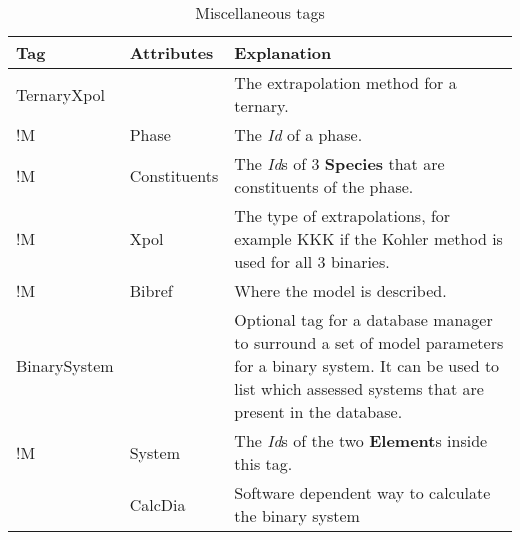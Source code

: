 \documentclass[10pt]{article}
\begin{document}

\begin{table}[!h]
  \caption{Miscellaneous tags}
\begin{tabular}{|p{} p{} p{}|}\hline
  Tag & Attributes & Explanation\\\hline

  TernaryXpol & & The extrapolation method for a ternary.\\
!M      & Phase & The {\em Id} of a phase.\\
!M      & Constituents & The {\em Id}s of 3 {\bf Species}  that are 
           constituents of the phase.\\
!M      & Xpol & The type of extrapolations, for example KKK if
           the Kohler method is used for all 3 binaries. \\
!M      & Bibref & Where the model is described.\\\hline

BinarySystem & & Optional tag for a database manager to surround
                a set of model parameters for a binary system.
                It can be used to list which assessed systems
                that are present in the database. \\
!M & System & The {\em Id}s of the two {\bf Element}s inside this tag.\\
   & CalcDia & Software dependent way to calculate the binary system\\\hline

\end{tabular}
\end{table}

\newpage
\end{document}
